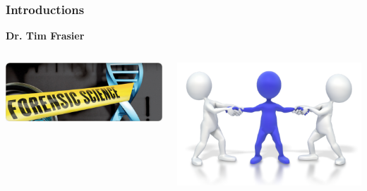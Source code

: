 \documentclass[10pt]{beamer}
\begin{document}
\begin{frame}[t]
\frametitle{Introductions}
\vspace{0.5cm}
	
	\begin{center}
		\textbf{Dr. Tim Frasier}
	\end{center}
	
	\vspace{0.25cm}
	
	\begin{columns}
		\begin{column}{0.33\textwidth}
			\begin{center}
				\includegraphics[width=1.0\textwidth]{figures/forensics.jpg}
			\end{center}
		\end{column}
		
		\begin{column}{0.33\textwidth}
			\begin{center}
				\includegraphics[width=1.0\textwidth]{figures/pulled.png}
			\end{center}
		\end{column}
		

\end{columns}
\end{frame}
\end{document}
